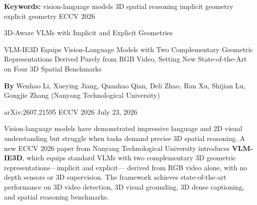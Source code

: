 \documentclass[10pt,twocolumn]{article}
\begin{document}
\setlength{\parindent}{0pt}
\setlength{\parskip}{4pt}

{\small\color{keywordgray}\textbf{Keywords:}
  vision-language models \textbullet{}
  3D spatial reasoning \textbullet{}
  implicit geometry \textbullet{}
  explicit geometry \textbullet{}
  ECCV 2026}\par\vspace{4pt}

{\LARGE\bfseries\raggedright
  3D-Aware VLMs with Implicit and Explicit Geometries}\par\vspace{4pt}

{\large\itshape\raggedright
  VLM-IE3D Equips Vision-Language Models with Two Complementary
  Geometric Representations Derived Purely from RGB Video,
  Setting New State-of-the-Art on Four 3D Spatial Benchmarks}\par\vspace{6pt}

{\small\textbf{By} Wenhao Li, Xueying Jiang, Quanhao Qian, Deli Zhao,
  Ran Xu, Shijian Lu, Gongjie Zhang
  (Nanyang Technological University)}\par\vspace{2pt}

{\small\color{keywordgray}arXiv:2607.21595 \textbullet{}
  ECCV 2026 \textbullet{} July 23, 2026}
\par\vspace{2pt}\noindent{\color{rulered}\rule{\columnwidth}{0.6pt}}\vspace{6pt}

Vision-language models have demonstrated impressive language and 2D
visual understanding but struggle when tasks demand precise 3D spatial
reasoning. A new ECCV 2026 paper from Nanyang Technological University
introduces \textbf{VLM-IE3D}, which equips standard VLMs with two
complementary 3D geometric representations---implicit and explicit---
derived from RGB video alone, with no depth sensors or 3D supervision.
The framework achieves state-of-the-art performance on 3D video detection,
3D visual grounding, 3D dense captioning, and spatial reasoning benchmarks.
\end{document}
